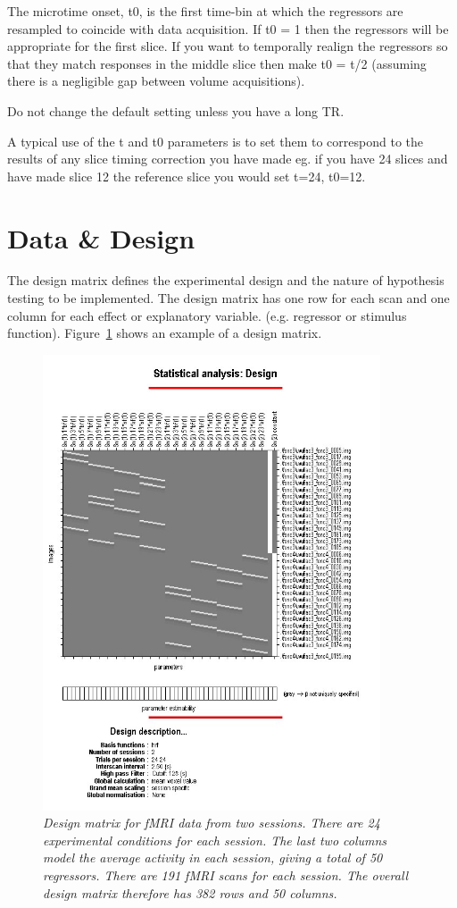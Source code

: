 The microtime onset, t0, is the first time-bin at which the regressors are resampled to coincide with data acquisition.  If t0 = 1 then the regressors will be appropriate for the first slice.  If you want to temporally realign the regressors so that they match responses in the middle slice then make t0 = t/2 (assuming there is a negligible gap between volume acquisitions).

Do not change the default setting unless you have a long TR. 

A typical use of the t and t0 parameters is to set them to correspond to the results of any slice timing correction you have made eg. if you have 24 slices and have made slice 12 the reference slice you would set t=24, t0=12. 

\section{Data \& Design}

The design matrix defines the experimental design and the nature of hypothesis testing to be implemented.  The design matrix has one row for each scan and one column for each effect or explanatory variable. (e.g. regressor or stimulus function).  Figure~\ref{design} shows an example of a design matrix.

\begin{figure}
\begin{center}
\includegraphics[width=100mm]{fmri_spec/design}
\end{center}
\caption{\em Design matrix for fMRI data from two sessions. There are 24 experimental conditions for each session. The last two columns model the average activity in each session, giving a total of 50 regressors. There are 191 fMRI scans for each session. The overall design matrix therefore has 382 rows and 50 columns. \label{design}}
\end{figure}

